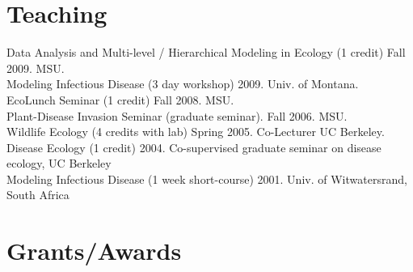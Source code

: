\documentclass[12pt,]{article}
\begin{document}
\hypertarget{teaching}{%
\section{Teaching}\label{teaching}}

Data Analysis and Multi-level / Hierarchical Modeling in Ecology (1
credit) Fall 2009. MSU.\\
Modeling Infectious Disease (3 day workshop) 2009. Univ. of Montana.\\
EcoLunch Seminar (1 credit) Fall 2008. MSU.\\
Plant-Disease Invasion Seminar (graduate seminar). Fall 2006. MSU.\\
Wildlife Ecology (4 credits with lab) Spring 2005. Co-Lecturer UC
Berkeley.\\
Disease Ecology (1 credit) 2004. Co-supervised graduate seminar on
disease ecology, UC Berkeley\\
Modeling Infectious Disease (1 week short-course) 2001. Univ. of
Witwatersrand, South Africa

\hypertarget{grantsawards}{%
\section{Grants/Awards}\label{grantsawards}}
\end{document}
